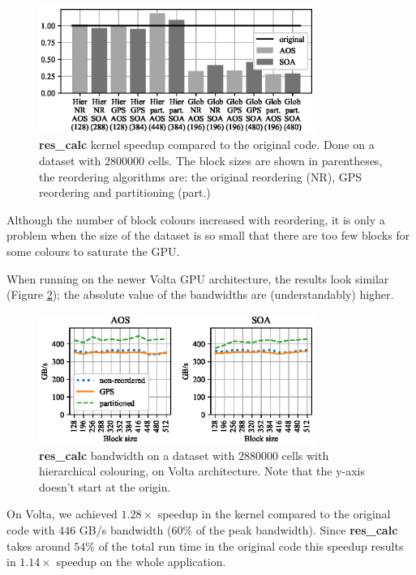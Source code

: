 \begin{figure}[Htbp]
  \centering
  \includegraphics[width=9cm]{fig/airfoil_speedup_large.eps}
  \caption{\textbf{res\_calc} kernel speedup compared to the original code. Done
  on a dataset with $2800000$ cells. The block sizes are shown in parentheses,
  the reordering algorithms are: the original reordering (NR), GPS reordering
  and partitioning (part.)}
  \label{fig:airfoil_speedup_large}
\end{figure}

Although the number of block colours increased with reordering, it is only a
problem when the size of the dataset is so small that there are too few blocks for some colours to saturate the GPU.

When running on the newer Volta GPU architecture, the results look similar
(Figure \ref{fig:airfoil_bw-vs-bs_hier_large_volta}); the absolute value of the
bandwidths are (understandably) higher.

\begin{figure}[Htbp]
  \centering
  \includegraphics[width=9cm]{fig/airfoil_bw-vs-bs_hier_large_volta.eps}
  \caption{\textbf{res\_calc} bandwidth on a dataset with $2880000$ cells with
  hierarchical colouring, on Volta architecture. Note that the y-axis doesn't
  start at the origin.}
  \label{fig:airfoil_bw-vs-bs_hier_large_volta}
\end{figure}

On Volta, we achieved $1.28\times$ speedup in the kernel compared to the
original code with $446$ GB/s bandwidth ($60\%$ of the peak bandwidth). 
Since \textbf{res\_calc} takes around $54\%$ of the total run time in the
original code this speedup results in $1.14\times$ speedup on the
whole application.

